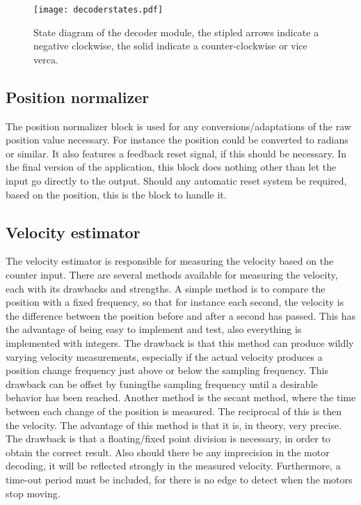 \begin{figure}[htb]
\texttt{[image: decoderstates.pdf]}
\caption{State diagram of the decoder module, the stipled arrows indicate a negative clockwise, the solid indicate a counter-clockwise or vice verca.}
\label{fig:decoderstate}
\end{figure}

\subsection{Position normalizer}
The position normalizer block is used for any conversions/adaptations of the raw position value necessary. For instance the position could be converted to radians or similar. It also features a feedback reset signal, if this should be necessary. 
In the final version of the application, this block does nothing other than let the input go directly to the output.
Should any automatic reset system be required, based on the position, this is the block to handle it.

\subsection{Velocity estimator}
The velocity estimator is responsible for measuring the velocity based on the counter input.
There are several methods available for measuring the velocity, each with its drawbacks and strengths.
A simple method is to compare the position with a fixed frequency, so that for instance each second, the velocity is the difference between the position before and after a second has passed. This has the advantage of being easy to implement and test, also everything is implemented with integers. The drawback is that this method can produce wildly varying velocity measurements, especially if the actual velocity produces a position change frequency just above or below the sampling frequency.
This drawback can be offset by \"tuning\" the sampling frequency until a desirable behavior has been reached.
Another method is the secant method, where the time between each change of the position is measured. The reciprocal of this is then the velocity. The advantage of this method is that it is, in theory, very precise. The drawback is that a floating/fixed point division is necessary, in order to obtain the correct result. Also should there be any imprecision in the motor decoding, it will be reflected strongly in the measured velocity. Furthermore, a time-out period must be included, for there is no edge to detect when the motors stop moving.

